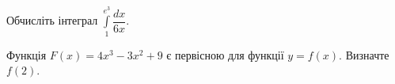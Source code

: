 \documentclass[12pt]{article}
\begin{document}
\begin{samepage}
\par{}
\end{samepage}


\begin{samepage}
\noindent\zadnum Обчисліть інтеграл $\displaystyle\int\limits_1^{e^3} \dfrac{dx}{6x}$. 

\nmtnobreak
\nopagebreak\nbvspace{0.5cm}
\nmtAnswerBox
\par{}
\end{samepage}

\begin{samepage}
\noindent\zadnum Функція $F(x) = 4x^3 - 3x^2 + 9$ є первісною для функції $y=f(x)$. Визначте $f(2)$. 

\nmtnobreak
\nopagebreak\nbvspace{0.5cm}
\nmtAnswerBox
\par{}
\end{samepage}
\end{document}
